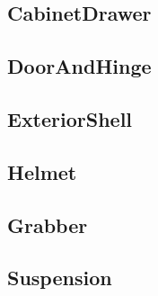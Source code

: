 \subsection{CabinetDrawer} 
 \subsection{DoorAndHinge} 
 \subsection{ExteriorShell} 
 \subsection{Helmet} 
 \subsection{Grabber} 

\subsection{Suspension} 


